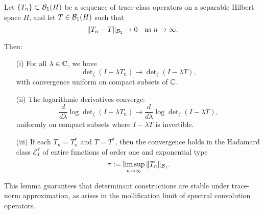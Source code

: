 \begin{lemma}
\label{lem:det_continuity_trace_norm}
Let \( \{ T_n \} \subset \mathcal{B}_1(H) \) be a sequence of trace-class operators on a separable Hilbert space \( H \), and let \( T \in \mathcal{B}_1(H) \) such that
\[
\| T_n - T \|_{\mathcal{B}_1} \to 0 \quad \text{as } n \to \infty.
\]

Then:
\begin{enumerate}
  \item[\textnormal{(i)}] For all \( \lambda \in \mathbb{C} \), we have
  \[
  \det\nolimits_\zeta(I - \lambda T_n) \to \det\nolimits_\zeta(I - \lambda T),
  \]
  with convergence uniform on compact subsets of \( \mathbb{C} \).

  \item[\textnormal{(ii)}] The logarithmic derivatives converge:
  \[
  \frac{d}{d\lambda} \log \det\nolimits_\zeta(I - \lambda T_n)
  \to \frac{d}{d\lambda} \log \det\nolimits_\zeta(I - \lambda T),
  \]
  uniformly on compact subsets where \( I - \lambda T \) is invertible.

  \item[\textnormal{(iii)}] If each \( T_n = T_n^* \) and \( T = T^* \), then the convergence holds in the Hadamard class \( \mathcal{E}_1^\tau \) of entire functions of order one and exponential type
  \[
  \tau := \limsup_{n \to \infty} \| T_n \|_{\mathcal{B}_1}.
  \]
\end{enumerate}

\medskip
\noindent
This lemma guarantees that determinant constructions are stable under trace-norm approximation, as arises in the mollification limit of spectral convolution operators.
\end{lemma}
